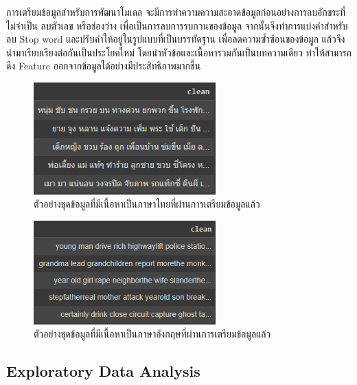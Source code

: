\documentclass[12pt,oneside,openright,a4paper]{cpe-thai-project}
\begin{document}
\begin{itemize}
      \hspace{1cm}การเตรียมข้อมูลสำหรับการพัฒนาโมเดล จะมีการทำความความสะอาดข้อมูลก่อนอย่างการลบอักขระที่ไม่จำเป็น ลบตัวเลข หรือช่องว่าง
      เพื่อเป็นการลบการรบกวนของข้อมูล จากนั้นจึงทำการแบ่งคำสำหรับลบ Stop word และปรับคำให้อยู่ในรูปแบบที่เป็นบรรทัดฐาน เพื่อลดความซ้ำซ้อนของข้อมูล
      แล้วจึงนำมาเรียบเรียงต่อกันเป็นประโยคใหม่ โดยนำหัวข้อและเนื้อหารวมกันเป็นบทความเดียว ทำให้สามารถดึง Feature ออกจากข้อมูลได้อย่างมีประสิทธิภาพมากขึ้น
      \newpage
      \begin{figure}[!ht]\centering
        \includegraphics[width=7cm]{./img/new_th_train.png}
        \caption{ตัวอย่างชุดข้อมูลที่มีเนื้อหาเป็นภาษาไทยที่ผ่านการเตรียมข้อมูลแล้ว}\label{fig:new_th_train}
      \end{figure}

      \begin{figure}[!ht]\centering
        \includegraphics[width=7cm]{./img/news_eng_train.png}
        \caption{ตัวอย่างชุดข้อมูลที่มีเนื้อหาเป็นภาษาอังกฤษที่ผ่านการเตรียมข้อมูลแล้ว}\label{fig:new_eng_train}
      \end{figure}

    \subsection{Exploratory Data Analysis}

\end{itemize}
\end{document}
